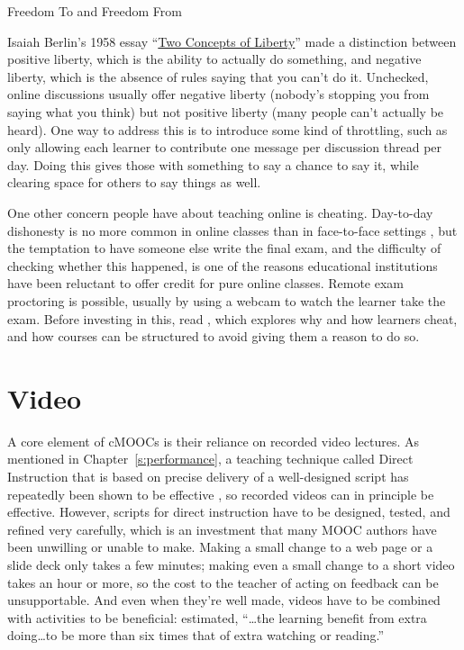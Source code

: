 \begin{aside}{Freedom To and Freedom From}

Isaiah Berlin's 1958 essay ``\href{https://en.wikipedia.org/wiki/Two\_Concepts\_of\_Liberty}{Two Concepts of
Liberty}'' made a distinction between positive
liberty, which is the ability to actually do something, and negative
liberty, which is the absence of rules saying that you can't do
it. Unchecked, online discussions usually offer negative liberty
(nobody's stopping you from saying what you think) but not positive
liberty (many people can't actually be heard). One way to address
this is to introduce some kind of throttling, such as only allowing
each learner to contribute one message per discussion thread per
day. Doing this gives those with something to say a chance to say
it, while clearing space for others to say things as well.

\end{aside}

One other concern people have about teaching online is cheating.
Day-to-day dishonesty is no more common in online classes than in
face-to-face settings \cite{Beck2014}, but the temptation to have
someone else write the final exam, and the difficulty of checking
whether this happened, is one of the reasons educational institutions
have been reluctant to offer credit for pure online classes. Remote exam
proctoring is possible, usually by using a webcam to watch the learner
take the exam. Before investing in this, read \cite{Lang2013}, which
explores why and how learners cheat, and how courses can be structured
to avoid giving them a reason to do so.

\section{Video}\label{s:online-video}

A core element of cMOOCs is their reliance on recorded video lectures.
As mentioned in Chapter~\ref{s:performance}, a teaching technique called
Direct Instruction that is based on precise delivery of a well-designed
script has repeatedly been shown to be effective \cite{Stoc2018}, so
recorded videos can in principle be effective. However, scripts for
direct instruction have to be designed, tested, and refined very
carefully, which is an investment that many MOOC authors have been
unwilling or unable to make. Making a small change to a web page or a
slide deck only takes a few minutes; making even a small change to a
short video takes an hour or more, so the cost to the teacher of acting
on feedback can be unsupportable. And even when they're well made,
videos have to be combined with activities to be beneficial:
\cite{Koed2015} estimated, ``\ldots{}the learning benefit from
extra doing\ldots{}to be more than six times that of extra
watching or reading.''


